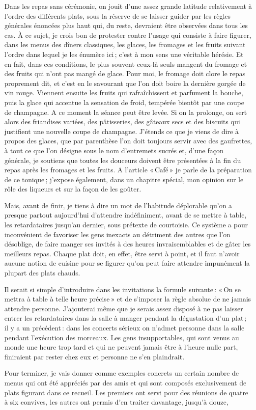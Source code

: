 Dans les repas sans cérémonie, on jouit d'une assez grande latitude
relativement à l'ordre des différents plats, sous la réserve de se laisser
guider par les règles générales énoncées plus haut qui, du reste, devraient
être observées dans tous les cas. À ce sujet, je crois bon de protester contre
l'usage qui consiste à faire figurer, dans les menus des dîners classiques, les
glaces, les fromages et les fruits suivant l'ordre dans lequel je les énumère
ici ; c'est à mon sens une véritable hérésie. Et en fait, dans ces conditions,
le plus souvent ceux-là seuls mangent du fromage et des fruits qui n'ont pas
mangé de glace. Pour moi, le fromage doit clore le repas proprement dit, et
c'est en le savourant que l'on doit boire la dernière gorgée de vin rouge.
Viennent ensuite les fruits qui rafraîchissent et parfument la bouche, puis la
glace qui accentue la sensation de froid, tempérée bientôt par une coupe de
champagne. A ce moment la séance peut être levée. Si on la prolonge, on sert
alors des friandises variées, des pâtisseries, des gâteaux secs et des biscuits
qui justifient une nouvelle coupe de champagne. J'étends ce que je viens de
dire à propos des glaces, que par parenthèse l'on doit toujours servir avec des
gaufrettes, à tout ce que l’on désigne sous le nom d'entremets sucrés et, d'une
façon générale, je soutiens que toutes les douceurs doivent être présentées
à la fin du repas après les fromages et les fruits. A l’article « Café » je
parle de la préparation de ce tonique ; j'expose également, dans un chapitre
spécial, mon opinion sur le rôle des liqueurs et sur la façon de les goûter.

Mais, avant de finir, je tiens à dire un mot de l'habitude déplorable qu'on
a presque partout aujourd'hui d'attendre indéfiniment, avant de se mettre
à table, les retardataires jusqu'au dernier, sous prétexte de courtoisie. Ce
système a pour inconvénient de favoriser les gens inexacts au détriment des
autres que l'on désoblige, de faire manger ses invités à des heures
invraisemblables et de gâter les meilleurs repas. Chaque plat doit, en effet,
être servi à point, et il faut n'avoir aucune notion de cuisine pour se figurer
qu'on peut faire attendre impunément la plupart des plats chauds.

Il serait si simple d'introduire dans les invitations la formule suivante :
« On se mettra à table à telle heure précise » et de s'imposer la règle absolue
de ne jamais attendre personne. J'ajouterai même que je serais assez disposé
à ne pas laisser entrer les retardataires dans la salle à manger pendant la
dégustation d'un plat ; il y a un précédent : dans les concerts sérieux on
n'admet personne dans la salle pendant l'exécution des morceaux. Les gens
insupportables, qui sont venus au monde une heure trop tard et qui ne peuvent
jamais être à l'heure nulle part, finiraient par rester chez eux et personne ne
s'en plaindrait.

Pour terminer, je vais donner comme exemples concrets un certain nombre de
menus qui ont été appréciés par des amis et qui sont composés exclusivement de
plats figurant dans ce recueil. Les premiers ont servi pour des réunions de
quatre à six convives, les autres ont permis d'en traiter davantage, jusqu'à
douze,
